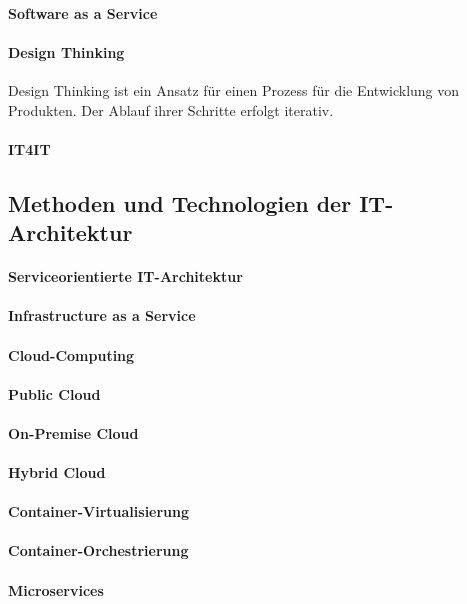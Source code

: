 \cite{Alt2017}


\paragraph{Software as a Service}

\paragraph{Design Thinking}
Design Thinking ist ein Ansatz für einen Prozess für die Entwicklung von Produkten. Der Ablauf ihrer Schritte erfolgt iterativ. 

\paragraph{IT4IT}

\subsection{Methoden und Technologien der IT-Architektur}


\paragraph{Serviceorientierte IT-Architektur}


\paragraph{Infrastructure as a Service}


\paragraph{Cloud-Computing}


\paragraph{Public Cloud}


\paragraph{On-Premise Cloud}


\paragraph{Hybrid Cloud}

\paragraph{Container-Virtualisierung}

\paragraph{Container-Orchestrierung}

\paragraph{Microservices}